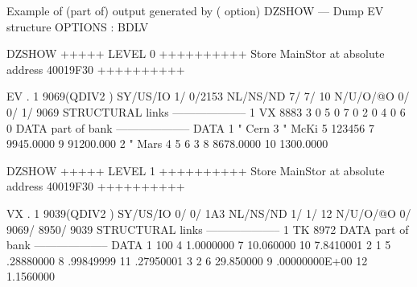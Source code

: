 \begin{Listing}{Example of (part of) output generated by  ( option)}
DZSHOW --- Dump EV structure                                                                       OPTIONS : BDLV                
                                                                                                                                 
DZSHOW  +++++ LEVEL     0 ++++++++++            Store  MainStor at absolute address 40019F30      ++++++++++                     
                                                                                                                                 
 EV  .     1     9069(QDIV2   ) SY/US/IO    1/    0/2153 NL/NS/ND    7/    7/      10 N/U/O/@O       0/       0/       1/    9069
STRUCTURAL links                                          --------------------                                                   
          1    VX        8883     3                 0     5                 0     7                 0                            
          2                 0     4                 0     6                 0                                                    
DATA part of bank                                         --------------------                                                   
DATA      1     "        Cern     3     "        McKi     5            123456     7     9945.0000         9     91200.000        
          2     "        Mars     4                 5     6                 3     8     8678.0000        10     1300.0000        
                                                                                                                                 
DZSHOW  +++++ LEVEL     1 ++++++++++            Store  MainStor at absolute address 40019F30      ++++++++++                     
                                                                                                                                 
 VX  .     1     9039(QDIV2   ) SY/US/IO    0/    0/ 1A3 NL/NS/ND    1/    1/      12 N/U/O/@O       0/    9069/    8950/    9039
STRUCTURAL links                                          --------------------                                                   
          1    TK        8972                                                                                                    
DATA part of bank                                         --------------------                                                   
DATA      1               100     4     1.0000000         7     10.060000        10     7.8410001                                
          2                 1     5     .28880000         8     .99849999        11     .27950001                                
          3                 2     6     29.850000         9     .00000000E+00    12     1.1560000                                
                                                                                                                                 

\end{Listing}
